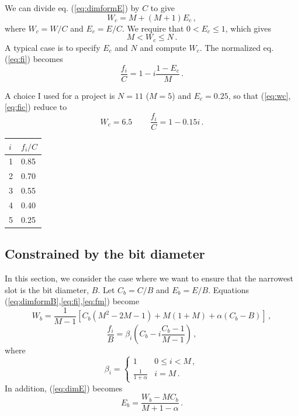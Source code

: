 \documentclass[12pt,final]{article}
\begin{document}
We can divide eq. (\ref{eq:dimformE}) by $C$ to give
\begin{equation}
  \label{eq:wc}
  W_c = M + (M + 1) E_c\,,
\end{equation}
where $W_c = W/C$ and $E_c = E / C$.  We require that $0 < E_c \le 1$,
which gives
\begin{equation}
  M < W_c \le N\,.
\end{equation}
A typical case is to specify $E_c$ and $N$ and compute $W_c$. The
normalized eq. (\ref{eq:fi}) becomes
\begin{equation}
  \label{eq:fic}
  \frac{f_i}{C} = 1 - i \frac{1 - E_c}{M}\,.
\end{equation}

A choice I used for a project is $N = 11$ ($M=5$) and $E_c = 0.25$, so that
(\ref{eq:wc},\ref{eq:fic}) reduce to
\begin{equation}
  W_c = 6.5\, \qquad
  \frac{f_i}{C} = 1 - 0.15 i\,.
\end{equation}
\begin{center}
\begin{tabular}{l|l}
  $i$ & $f_i/C$ \\
  \hline
  1 & 0.85 \\
  2 & 0.70 \\
  3 & 0.55 \\
  4 & 0.40 \\
  5 & 0.25 \\
  \hline
\end{tabular}
\end{center}

\subsection{Constrained by the bit diameter}

In this section, we consider the case where we want to ensure that the
narrowest slot is the bit diameter, $B$.
Let $C_b = C / B$ and $E_b = E / B$.  Equations
(\ref{eq:dimformB},\ref{eq:fi},\ref{eq:fm}) become
\begin{equation}
  \label{eq:wb}
  W_b = \frac{1}{M-1} \left[C_b(M^2 - 2 M -1) + M (1+M) + 
    \alpha (C_b - B)\right]\,,
\end{equation}
\begin{equation}
  \label{eq:fib}
  \frac{f_i}{B} =  \beta_i \left(C_b - i \frac{C_b - 1}{M-1}\right)\,,
\end{equation}
where
\begin{equation}
  \beta_i = 
  \begin{cases}
      1 & 0 \le i < M\,,\\
      \frac{1}{1 + \alpha} & i = M\,.
  \end{cases}
\end{equation}
In addition, (\ref{eq:dimE}) becomes
\begin{equation}
  \label{eq:eb}
  E_b = \frac{W_b - M C_b}{M + 1 - \alpha}\,.
\end{equation}
\end{document}
